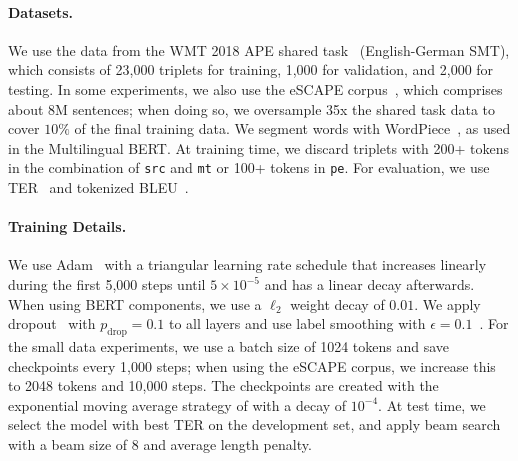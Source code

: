 \paragraph*{Datasets.}
We use the data from the WMT 2018 APE shared
task~\citep{Chatterjee2018} (English-German SMT), which consists of
23,000 triplets for training, 1,000 for validation, and 2,000 for
testing. In some experiments, we also use the eSCAPE
corpus~\citep{negri2018escape}, which comprises about 8M sentences;
when doing so, we oversample 35x the shared task data to cover $10\%$
of the final training data. We segment words with
WordPiece~\citep{wu2016google}, as used in the
Multilingual BERT. At training time, we discard triplets with 200+
tokens in the combination of {\tt src} and {\tt mt} or 100+ tokens in
    {\tt pe}. For evaluation, we use TER~\citep{snover2006study} and
tokenized BLEU~\citep{papineni2002bleu}.

\paragraph*{Training Details.}
We use Adam~\citep{kingma2014adam} with a triangular learning rate
schedule that increases linearly during the first 5,000 steps until
$5\times 10^{-5}$ and has a linear decay afterwards. When using BERT
components, we use a $\ell_2$ weight decay of $0.01$. We apply
dropout~\citep{srivastava2014dropout} with $p_{\text{drop}}\!=\!0.1$ to all
layers and use label smoothing with
$\epsilon\!=\!0.1$~\citep{pereyra2017regularizing}. For the small data
experiments, we use a batch size of 1024 tokens and save checkpoints
every 1,000 steps; when using the eSCAPE corpus, we increase this to
2048 tokens and 10,000 steps. The checkpoints are created with the
exponential moving average strategy of \citet{junczys2018marian}
with a decay of $10^{-4}$. At test time, we select the model with
best TER on the development set, and apply beam search with a beam
size of 8 and average length penalty.

